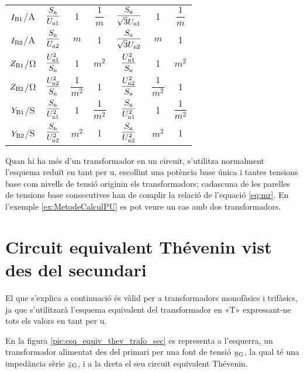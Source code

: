 \begin{ThreePartTable}
\begin{longtable}{ccccccc}
$I_\mathrm{B1}$/\unit{A} & $\dfrac{S_\mathrm{n}}{U_\mathrm{n1}}$ & 1 & $\dfrac{1}{m}$ & $\dfrac{S_\mathrm{n}}{\sqrt{3}U_\mathrm{n1}}$ & 1  & $\dfrac{1}{m}$\\[0.4cm]
$I_\mathrm{B2}$/\unit{A} & $\dfrac{S_\mathrm{n}}{U_\mathrm{n2}}$  & $m$ & 1 & $\dfrac{S_\mathrm{n}}{\sqrt{3}U_\mathrm{n2}}$   & $m$ & 1\\[0.4cm]
$Z_\mathrm{B1}$/\unit{\ohm} & $\dfrac{U_\mathrm{n1}^2}{S_\mathrm{n}}$ & 1 & $m^2$ & $\dfrac{U_\mathrm{n1}^2}{S_\mathrm{n}}$ & 1 & $m^2$\\[0.4cm]
$Z_\mathrm{B2}$/\unit{\ohm} & $\dfrac{U_\mathrm{n2}^2}{S_\mathrm{n}}$  & $\dfrac{1}{m^2}$ & 1& $\dfrac{U_\mathrm{n2}^2}{S_\mathrm{n}}$  & $\dfrac{1}{m^2}$ & 1\\[0.4cm]
$Y_\mathrm{B1}$/\unit{S} & $\dfrac{S_\mathrm{n}}{U_\mathrm{n1}^2}$ & 1 & $\dfrac{1}{m^2}$ & $\dfrac{S_\mathrm{n}}{U_\mathrm{n1}^2}$ & 1 & $\dfrac{1}{m^2}$ \\[0.4cm]
$Y_\mathrm{B2}$/\unit{S} & $\dfrac{S_\mathrm{n}}{U_\mathrm{n2}^2}$  & $m^2$ & 1 & $\dfrac{S_\mathrm{n}}{U_\mathrm{n2}^2}$ &$m^2$ &  1\\[0.4cm]
\bottomrule[1pt]
\end{longtable}
\end{ThreePartTable}


Quan hi ha més d'un transformador en un circuit, s'utilitza normalment l'esquema reduït en tant per u, escollint una potència base única i tantes tensions base com nivells de tensió  originin els transformadors; cadascuna de les parelles de tensions base consecutives han de complir la relació de l'equació \eqref{eq:mr}. En l'exemple \vref{ex:MetodeCalculPU} es pot veure un cas amb dos transformadors.

\section{Circuit equivalent Thévenin vist des del secundari}\label{sec:trafo-thevenin}

El que s'explica a continuació és vàlid per a transformadors
monofàsics i trifàsics, ja que s'utilitzarà l'esquema equivalent del
transformador en «T» expressant-ne tots els valors en tant per u.

En la figura \vref{pic:esq_equiv_thev_trafo_sec}  es representa a
l'esquerra, un transformador alimentat des del primari per una font
de tensió $\cmplx{u}\ped{G}$, la qual té una impedància sèrie
$\cmplx{z}\ped{G}$, i a  la dreta el seu circuit equivalent
Thévenin.

\begin{center}
    
    \label{pic:esq_equiv_thev_trafo_sec}
\end{center}

